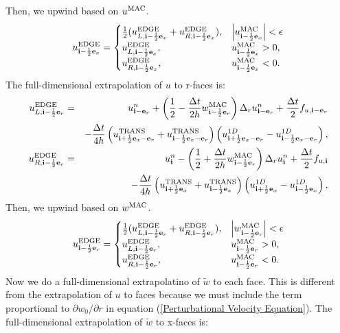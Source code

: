 \documentclass[11pt]{article}
\def\half  {\frac{1}{2}}
\def\dt    {\Delta t}
\def\edge  {\rm EDGE}
\def\mac   {\rm MAC}
\def\trans {\rm TRANS}
\def\eb    {{\bf e}}
\def\ib    {{\bf i}}
\def\wt    {\tilde{w}}
\begin{document}
Then, we upwind based on $u^{\mac}$.
\begin{equation}
u_{\ib-\half\eb_x}^{\edge} =
\begin{cases}
\half(u_{L,\ib-\half\eb_x}^{\edge} + u_{R,\ib-\half\eb_x}^{\edge}), & \left|u^{\mac}_{\ib-\half\eb_x}\right| < \epsilon \\
u_{L,\ib-\half\eb_x}^{\edge}, & u^{\mac}_{\ib-\half\eb_x} > 0, \\
u_{R,\ib-\half\eb_x}^{\edge}, & u^{\mac}_{\ib-\half\eb_x} < 0.
\end{cases}
\end{equation}
The full-dimensional extrapolation of $u$ to r-faces is:
\begin{eqnarray}
u_{L,\ib-\half\eb_r}^{\edge} &=& u_{\ib-\eb_r}^n + \left(\half - \frac{\dt}{2h}w_{\ib-\half\eb_r}^{\mac}\right)\Delta_r u_{\ib-\eb_r}^n + \frac{\dt}{2}f_{u,\ib-\eb_r} \nonumber \\
&& - \frac{\dt}{4h}\left(u_{\ib+\half\eb_x-\eb_r}^{\trans}+u_{\ib-\half\eb_x-\eb_r}^{\trans}\right)\left(u_{\ib+\half\eb_x-\eb_r}^{1D} - u_{\ib-\half\eb_x-\eb_r}^{1D}\right),  \\
u_{R,\ib-\half\eb_r}^{\edge} &=& u_{\ib}^n - \left(\half + \frac{\dt}{2h}w_{\ib-\half\eb_r}^{\mac}\right)\Delta_r u_{\ib}^n + \frac{\dt}{2}f_{u,\ib} \nonumber \\
&& - \frac{\dt}{4h}\left(u_{\ib+\half\eb_x}^{\trans}+u_{\ib-\half\eb_x}^{\trans}\right)\left(u_{\ib+\half\eb_x}^{1D} - u_{\ib-\half\eb_x}^{1D}\right). 
\end{eqnarray}
Then, we upwind based on $w^{\mac}$.
\begin{equation}
u_{\ib-\half\eb_r}^{\edge} =
\begin{cases}
\half(u_{L,\ib-\half\eb_r}^{\edge} + u_{R,\ib-\half\eb_r}^{\edge}), & \left|w^{\mac}_{\ib-\half\eb_r}\right| < \epsilon \\
u_{L,\ib-\half\eb_r}^{\edge}, & u^{\mac}_{\ib-\half\eb_r} > 0, \\
u_{R,\ib-\half\eb_r}^{\edge}, & u^{\mac}_{\ib-\half\eb_r} < 0.
\end{cases}
\end{equation}
Now we do a full-dimensional extrapolatino of $\wt$ to each face.  This is different from the extrapolation of $u$ to faces because we must include the term proportional to $\partial w_0/\partial r$ in equation (\ref{Perturbational Velocity Equation}).  The full-dimensional extrapolation of $\wt$ to x-faces is:
\end{document}
